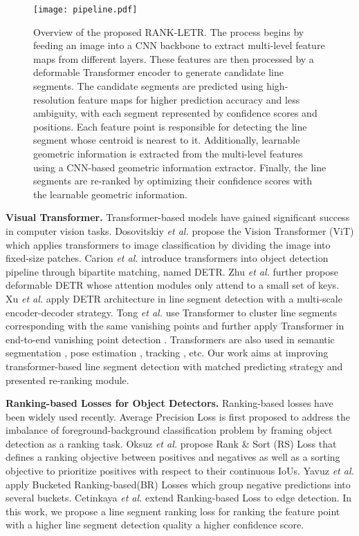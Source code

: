 \begin{figure*}[t]
    \centering
    \texttt{[image: pipeline.pdf]}
    \caption{Overview of the proposed RANK-LETR. The process begins by feeding an image into a CNN backbone to extract multi-level feature maps from different layers. These features are then processed by a deformable Transformer encoder to generate candidate line segments. The candidate segments are predicted using high-resolution feature maps for higher prediction accuracy and less ambiguity, with each segment represented by confidence scores and positions. Each feature point is responsible for detecting the line segment whose centroid is nearest to it. Additionally, learnable geometric information is extracted from the multi-level features using a CNN-based geometric information extractor. Finally, the line segments are re-ranked by optimizing their confidence scores with the learnable geometric information.}
    \label{fig:pipeline}
\end{figure*}

\noindent\textbf{Visual Transformer.} 
Transformer-based models have gained significant success in computer vision tasks. Dosovitskiy \textit{et al.} \cite{dosovitskiy2020image} propose the Vision Transformer (ViT) which applies transformers to image classification by dividing the image into fixed-size patches. Carion \textit{et al.} \cite{carion2020end} introduce transformers into object detection pipeline through bipartite matching, named DETR. Zhu \textit{et al.} \cite{zhu2020deformable} further propose deformable DETR whose attention modules only attend to a small set of keys. Xu \textit{et al.} \cite{xu2021line} apply DETR architecture in line segment detection with a multi-scale encoder-decoder strategy. 
Tong \textit{et al.} \cite{tong2022transformer} use Transformer to cluster line segments corresponding with the same vanishing points and further apply Transformer in end-to-end vanishing point detection \cite{tong2024end}. Transformers are also used in semantic segmentation \cite{xie2021segformer}, pose estimation \cite{huang2020hand}, tracking \cite{chen2021transformer}, etc. Our work aims at improving transformer-based line segment detection with matched predicting strategy and presented re-ranking module.

\noindent\textbf{Ranking-based Losses for Object Detectors.} Ranking-based losses have been widely used recently. Average Precision Loss is first proposed \cite{chen2019towards} to address the imbalance of foreground-background classification problem by framing object detection as a ranking task. Oksuz \textit{et al.} \cite{oksuz2021rank} propose Rank \& Sort (RS) Loss that defines a ranking objective between positives and negatives as well as a sorting objective to prioritize positives with respect to their continuous IoUs.
Yavuz \textit{et al.} \cite{yavuz2024bucketed} apply Bucketed Ranking-based(BR) Losses which group negative predictions into several buckets.
Cetinkaya \textit{et al.} \cite{Cetinkaya_2024_CVPR} extend Ranking-based Loss to edge detection. In this work, we propose a line segment ranking loss for ranking the feature point with a higher line segment detection quality a higher confidence score.
